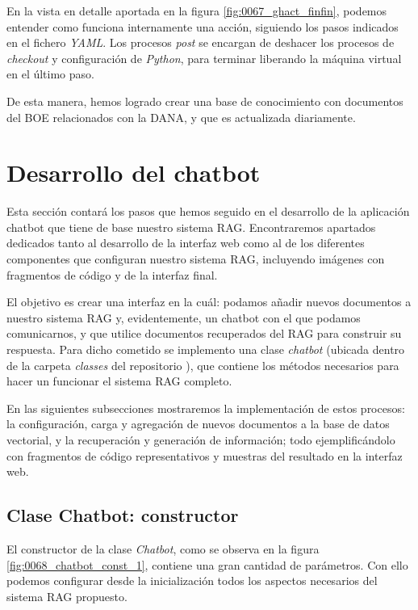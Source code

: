             \noindent En la vista en detalle aportada en la figura \ref{fig:0067_ghact_finfin}, podemos entender como funciona internamente una acción, siguiendo los pasos indicados en el fichero \textit{YAML}. Los procesos \textit{post} se encargan de deshacer los procesos de \textit{checkout} y configuración de \textit{Python}, para terminar liberando la máquina virtual en el último paso. 

            \noindent De esta manera, hemos logrado crear una base de conocimiento con documentos del BOE relacionados con la DANA, y que es actualizada diariamente.

    \section{Desarrollo del chatbot}

        Esta sección contará los pasos que hemos seguido en el desarrollo de la aplicación chatbot que tiene de base nuestro sistema RAG. Encontraremos apartados dedicados tanto al desarrollo de la interfaz web como al de los diferentes componentes que configuran nuestro sistema RAG, incluyendo imágenes con fragmentos de código y de la interfaz final.

        \noindent El objetivo es crear una interfaz en la cuál: podamos añadir nuevos documentos a nuestro sistema RAG y, evidentemente, un chatbot con el que podamos comunicarnos, y que utilice documentos recuperados del RAG para construir su respuesta. Para dicho cometido se implemento una clase \textit{chatbot} (ubicada dentro de la carpeta \textit{classes} del repositorio \cite{0045_repo}), que contiene los métodos necesarios para hacer un funcionar el sistema RAG completo. 

        \noindent En las siguientes subsecciones mostraremos la implementación de estos procesos: la configuración, carga y agregación de nuevos documentos a la base de datos vectorial, y la recuperación y generación de información; todo ejemplificándolo con fragmentos de código representativos y muestras del resultado en la interfaz web.

        \subsection{Clase Chatbot: constructor}

            El constructor de la clase \textit{Chatbot}, como se observa en la figura \ref{fig:0068_chatbot_const_1}, contiene una gran cantidad de parámetros. Con ello podemos configurar desde la inicialización todos los aspectos necesarios del sistema RAG propuesto.

